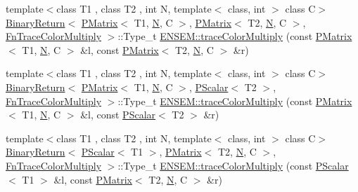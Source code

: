 \begin{DoxyCompactItemize}
\item 
{\footnotesize template$<$class T1 , class T2 , int N, template$<$ class, int $>$ class C$>$ }\\\mbox{\hyperlink{structENSEM_1_1BinaryReturn}{Binary\+Return}}$<$ \mbox{\hyperlink{classENSEM_1_1PMatrix}{P\+Matrix}}$<$ T1, \mbox{\hyperlink{adat__devel_2lib_2hadron_2operator__name__util_8cc_a7722c8ecbb62d99aee7ce68b1752f337}{N}}, C $>$, \mbox{\hyperlink{classENSEM_1_1PMatrix}{P\+Matrix}}$<$ T2, \mbox{\hyperlink{adat__devel_2lib_2hadron_2operator__name__util_8cc_a7722c8ecbb62d99aee7ce68b1752f337}{N}}, C $>$, \mbox{\hyperlink{structENSEM_1_1FnTraceColorMultiply}{Fn\+Trace\+Color\+Multiply}} $>$\+::Type\+\_\+t \mbox{\hyperlink{group__primmatrix_ga017dba078c2a41f5ca2a8d2b934b20aa}{E\+N\+S\+E\+M\+::trace\+Color\+Multiply}} (const \mbox{\hyperlink{classENSEM_1_1PMatrix}{P\+Matrix}}$<$ T1, \mbox{\hyperlink{adat__devel_2lib_2hadron_2operator__name__util_8cc_a7722c8ecbb62d99aee7ce68b1752f337}{N}}, C $>$ \&l, const \mbox{\hyperlink{classENSEM_1_1PMatrix}{P\+Matrix}}$<$ T2, \mbox{\hyperlink{adat__devel_2lib_2hadron_2operator__name__util_8cc_a7722c8ecbb62d99aee7ce68b1752f337}{N}}, C $>$ \&r)
\item 
{\footnotesize template$<$class T1 , class T2 , int N, template$<$ class, int $>$ class C$>$ }\\\mbox{\hyperlink{structENSEM_1_1BinaryReturn}{Binary\+Return}}$<$ \mbox{\hyperlink{classENSEM_1_1PMatrix}{P\+Matrix}}$<$ T1, \mbox{\hyperlink{adat__devel_2lib_2hadron_2operator__name__util_8cc_a7722c8ecbb62d99aee7ce68b1752f337}{N}}, C $>$, \mbox{\hyperlink{classENSEM_1_1PScalar}{P\+Scalar}}$<$ T2 $>$, \mbox{\hyperlink{structENSEM_1_1FnTraceColorMultiply}{Fn\+Trace\+Color\+Multiply}} $>$\+::Type\+\_\+t \mbox{\hyperlink{group__primmatrix_ga34f5dfd94ab05f405e04e73c9e342aeb}{E\+N\+S\+E\+M\+::trace\+Color\+Multiply}} (const \mbox{\hyperlink{classENSEM_1_1PMatrix}{P\+Matrix}}$<$ T1, \mbox{\hyperlink{adat__devel_2lib_2hadron_2operator__name__util_8cc_a7722c8ecbb62d99aee7ce68b1752f337}{N}}, C $>$ \&l, const \mbox{\hyperlink{classENSEM_1_1PScalar}{P\+Scalar}}$<$ T2 $>$ \&r)
\item 
{\footnotesize template$<$class T1 , class T2 , int N, template$<$ class, int $>$ class C$>$ }\\\mbox{\hyperlink{structENSEM_1_1BinaryReturn}{Binary\+Return}}$<$ \mbox{\hyperlink{classENSEM_1_1PScalar}{P\+Scalar}}$<$ T1 $>$, \mbox{\hyperlink{classENSEM_1_1PMatrix}{P\+Matrix}}$<$ T2, \mbox{\hyperlink{adat__devel_2lib_2hadron_2operator__name__util_8cc_a7722c8ecbb62d99aee7ce68b1752f337}{N}}, C $>$, \mbox{\hyperlink{structENSEM_1_1FnTraceColorMultiply}{Fn\+Trace\+Color\+Multiply}} $>$\+::Type\+\_\+t \mbox{\hyperlink{group__primmatrix_gad73631cec5794d9c294bbf815af14cc0}{E\+N\+S\+E\+M\+::trace\+Color\+Multiply}} (const \mbox{\hyperlink{classENSEM_1_1PScalar}{P\+Scalar}}$<$ T1 $>$ \&l, const \mbox{\hyperlink{classENSEM_1_1PMatrix}{P\+Matrix}}$<$ T2, \mbox{\hyperlink{adat__devel_2lib_2hadron_2operator__name__util_8cc_a7722c8ecbb62d99aee7ce68b1752f337}{N}}, C $>$ \&r)

\end{DoxyCompactItemize}
